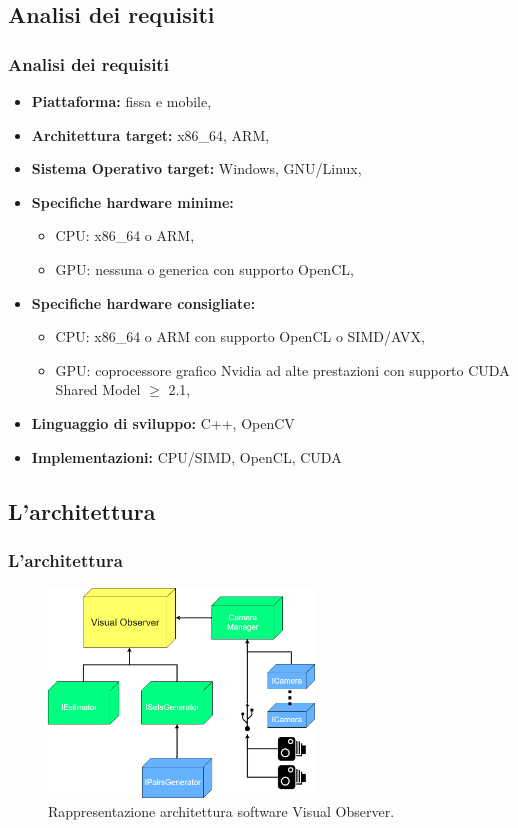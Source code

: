 \documentclass{beamer}
\begin{document}
\subsection{Analisi dei requisiti}
\begin{frame}
\frametitle{Analisi dei requisiti}
\begin{itemize}
	\item \textbf{Piattaforma:}  fissa e mobile,
	\item \textbf{Architettura target:}  x86\_64, ARM,
	\item \textbf{Sistema Operativo target:}  Windows, GNU/Linux,
	\item \textbf{Specifiche hardware minime:}
	\begin{itemize}
		\item CPU: x86\_64 o ARM,
		\item GPU: nessuna o generica con supporto OpenCL,
	\end{itemize} 
	\item \textbf{Specifiche hardware consigliate:}
	\begin{itemize}
		\item CPU: x86\_64 o ARM con supporto OpenCL o SIMD/AVX,
		\item GPU: coprocessore grafico Nvidia ad alte prestazioni con supporto CUDA Shared Model $\ge$ 2.1,
	\end{itemize}
	\item \textbf{Linguaggio di sviluppo:} C++, OpenCV	
	\item \textbf{Implementazioni:} CPU/SIMD, OpenCL, CUDA	 
\end{itemize}
\end{frame}

\subsection{L'architettura}
\begin{frame}
\frametitle{L'architettura}
\begin{figure}[h!]
\centering
\includegraphics[width=200pt]{imgs/arch.png}
\caption{Rappresentazione architettura software Visual Observer.}
\label{vis:impl:arch}
\end{figure} 
\end{frame}
\end{document}
